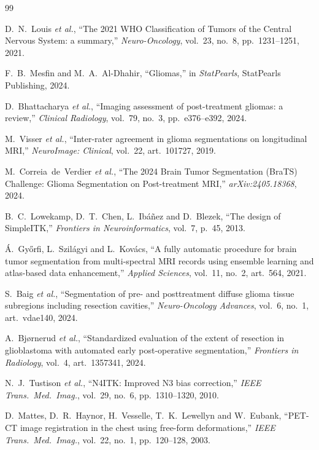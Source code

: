 \documentclass[conference]{IEEEtran}
\begin{document}
\begin{thebibliography}{99}

D.~N.~Louis \emph{et al.},
``The 2021 WHO Classification of Tumors of the Central Nervous
System: a summary,''
\emph{Neuro-Oncology}, vol.~23, no.~8, pp.~1231--1251, 2021.

F.~B.~Mesfin and M.~A.~Al-Dhahir,
``Gliomas,''
in \emph{StatPearls}, StatPearls Publishing, 2024.

D.~Bhattacharya \emph{et al.},
``Imaging assessment of post-treatment gliomas: a review,''
\emph{Clinical Radiology}, vol.~79, no.~3, pp.~e376--e392, 2024.

M.~Visser \emph{et al.},
``Inter-rater agreement in glioma segmentations on longitudinal
MRI,''
\emph{NeuroImage: Clinical}, vol.~22, art.~101727, 2019.

M.~Correia~de~Verdier \emph{et al.},
``The 2024 Brain Tumor Segmentation (BraTS) Challenge: Glioma
Segmentation on Post-treatment MRI,''
\emph{arXiv:2405.18368}, 2024.

B.~C.~Lowekamp, D.~T.~Chen, L.~Ib\'{a}\~{n}ez and D.~Blezek,
``The design of SimpleITK,''
\emph{Frontiers in Neuroinformatics}, vol.~7, p.~45, 2013.

\'A.~Gy\H{o}rfi, L.~Szil\'{a}gyi and L.~Kov\'{a}cs,
``A fully automatic procedure for brain tumor segmentation from
multi-spectral MRI records using ensemble learning and atlas-based
data enhancement,''
\emph{Applied Sciences}, vol.~11, no.~2, art.~564, 2021.

S.~Baig \emph{et al.},
``Segmentation of pre- and posttreatment diffuse glioma tissue
subregions including resection cavities,''
\emph{Neuro-Oncology Advances}, vol.~6, no.~1, art.~vdae140,
2024.

A.~Bj{\o}rnerud \emph{et al.},
``Standardized evaluation of the extent of resection in
glioblastoma with automated early post-operative segmentation,''
\emph{Frontiers in Radiology}, vol.~4, art.~1357341, 2024.

N.~J.~Tustison \emph{et al.},
``N4ITK: Improved N3 bias correction,''
\emph{IEEE Trans.\ Med.\ Imag.}, vol.~29, no.~6,
pp.~1310--1320, 2010.

D.~Mattes, D.~R.~Haynor, H.~Vesselle, T.~K.~Lewellyn and
W.~Eubank,
``PET-CT image registration in the chest using free-form
deformations,''
\emph{IEEE Trans.\ Med.\ Imag.}, vol.~22, no.~1,
pp.~120--128, 2003.


\end{thebibliography}
\end{document}
